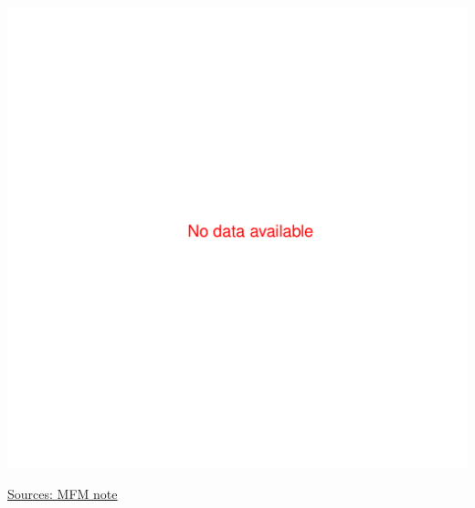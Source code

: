 \documentclass{article}\usepackage[]{graphicx}\usepackage[]{color}
\makeatletter
\def\maxwidth{ %
  \ifdim\Gin@nat@width>\linewidth
    \linewidth
  \else
    \Gin@nat@width
  \fi
}
\makeatother
\begin{document}
\begin{minipage}[b]{0.99\textwidth}
\begin{minipage}[t]{0.99\textwidth}
\begin{minipage}[c]{0.49\textwidth}
{\centering \includegraphics[width=\maxwidth]{figure/projectStatus_amount-1} 

}



      \end{minipage}
 
\raggedright{\footnotesize{\href{http://www.worldbank.org/en/topic/macroeconomics/overview}{Sources: MFM note}}}
   \end{minipage}
\end{minipage}
\end{document}
